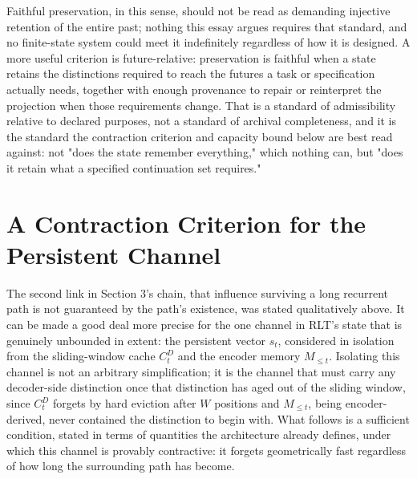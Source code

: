 \documentclass[11pt]{article}
\begin{document}
Faithful preservation, in this sense, should not be read as demanding injective retention of the entire past; nothing this essay argues requires that standard, and no finite-state system could meet it indefinitely regardless of how it is designed. A more useful criterion is future-relative: preservation is faithful when a state retains the distinctions required to reach the futures a task or specification actually needs, together with enough provenance to repair or reinterpret the projection when those requirements change. That is a standard of admissibility relative to declared purposes, not a standard of archival completeness, and it is the standard the contraction criterion and capacity bound below are best read against: not "does the state remember everything," which nothing can, but "does it retain what a specified continuation set requires."

\section{A Contraction Criterion for the Persistent Channel}
\label{sec:contraction-criterion}

The second link in Section 3's chain, that influence surviving a long recurrent path is not guaranteed by the path's existence, was stated qualitatively above. It can be made a good deal more precise for the one channel in RLT's state that is genuinely unbounded in extent: the persistent vector $s_t$, considered in isolation from the sliding-window cache $C_t^D$ and the encoder memory $M_{\le t}$. Isolating this channel is not an arbitrary simplification; it is the channel that must carry any decoder-side distinction once that distinction has aged out of the sliding window, since $C_t^D$ forgets by hard eviction after $W$ positions and $M_{\le t}$, being encoder-derived, never contained the distinction to begin with. What follows is a sufficient condition, stated in terms of quantities the architecture already defines, under which this channel is provably contractive: it forgets geometrically fast regardless of how long the surrounding path has become.
\end{document}
